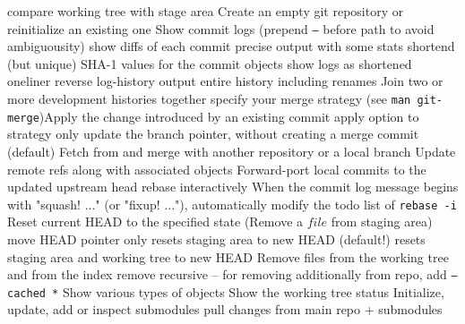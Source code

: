 	{compare working tree with stage area}
	{Create an empty git repository or reinitialize an existing one}
	{Show commit logs (prepend {\tt --} before path to avoid ambiguousity)}
	{show diffs of each commit}
	{precise output with some stats}
	{shortend (but unique) SHA-1 values for the commit objects }
	{show logs as shortened oneliner}
	{reverse log-history output}
	{entire history including renames}
	{Join two or more development histories together}
	{specify your merge strategy (see {\tt man git-merge})}Apply the change introduced by an existing commit
	{apply option to strategy}
	{only update the branch pointer, without creating a merge commit (default)}
	{Fetch from and merge with another re\-pository or a local branch}
	{Update remote refs along with associated objects}
	{Forward-port local commits to the updated upstream head}
	{rebase interactively}
	{When the commit log message begins with "squash! ..." (or "fixup! ..."), automatically modify the todo list of {\tt rebase -i} }
	{Reset current HEAD to the specified state (Remove a $file$ from staging area)}
	{move HEAD pointer only}
	{resets staging area to new HEAD (default!)}
	{resets staging area and working tree to new HEAD}
	{Remove files from the working tree and from the index}
	{remove recursive -- for removing additionally from repo, add
{\tt --cached *}}
	{Show various types of objects}
	{Show the working tree status}
	{Initialize, update, add or inspect submodules}
	{pull changes from main repo + submodules}

